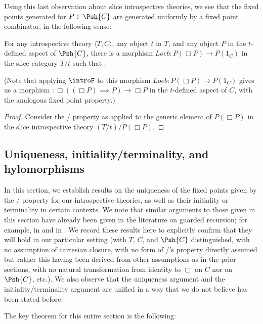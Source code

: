Using this last observation about slice introspective theories, we see that the fixed points generated for $P \in \Psh{C}$ are generated uniformly by a fixed point combinator, in the following sense:
\begin{theorem}
For any introspective theory $\langle T, C \rangle$, any object $t$ in $T$, and any object $P$ in the $t$-defined aspect of $\Psh{C}$, there is a morphism $Loeb : P(\Box P) \to P(1_C)$ in the slice category $T/t$ such that \TODO.

(Note that applying $\introF$ to this morphism $Loeb : P(\Box P) \to P(1_C)$ gives us a morphism $: \Box((\Box P) \implies P) \to \Box P$ in the $t$-defined aspect of $C$, with the analogous fixed point property.)
\end{theorem}
\begin{proof}
Consider the \Loeb/ property as applied to the generic element of $P(\Box P)$ in the slice introspective theory $(T/t)/P(\Box P)$.
\end{proof}

\subsection{Uniqueness, initiality/terminality, and hylomorphisms}
In this section, we establish results on the uniqueness of the fixed points given by the \Loeb/ property for our introspective theories, as well as their initiality or terminality in certain contexts. We note that similar arguments to those given in this section have already been given in the literature on guarded recursion; for example, in \autocite{birkedal2011first} and in \autocite{birkedal2013universes}. We record these results here to explicitly confirm that they will hold in our particular setting (with $T$, $C$, and $\Psh{C}$ distinguished, with no assumption of cartesian closure, with no form of \Loeb/'s property directly assumed but rather this having been derived from other assumptions as in the prior sections, with no natural transformation from identity to $\Box$ on $C$ nor on $\Psh{C}$, etc.). We also observe that the uniqueness argument and the initiality/terminality argument are unified in a way that we do not believe has been stated before.

The key theorem for this entire section is the following:

